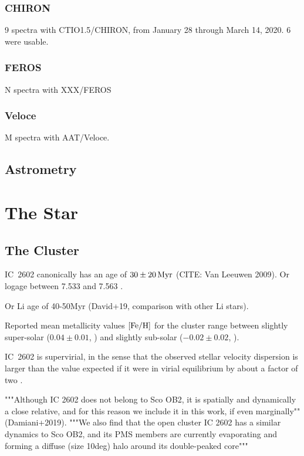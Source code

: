 \documentclass[12pt,twocolumn,tighten]{aastex62}
\begin{document}
\subsubsection{CHIRON}
9 spectra with CTIO1.5/CHIRON, from January 28 through March 14, 2020.
6 were usable.

\subsubsection{FEROS}
N spectra with XXX/FEROS

\subsubsection{Veloce}
M spectra with AAT/Veloce.

\subsection{Astrometry}


\section{The Star}
\label{sec:star}

\subsection{The Cluster}
\label{subsec:cluster}


IC~2602 canonically has an age of $30\pm20\,{\rm Myr}$ (CITE: Van
Leeuwen 2009).
Or logage between 7.533 and 7.563	\citep{bossini_age_2019}.

Or Li age of 40-50Myr (David+19, comparison with other Li stars).

Reported mean metallicity values ${\rm [Fe/H]}$ for the cluster range between
slightly super-solar ($0.04\pm0.01$, \citealt{baratella_gaia-eso_2020}) and
slightly sub-solar ($-0.02 \pm 0.02$, \citealt{netopil_metallicity_2016}).

IC~2602 is supervirial, in the sense that the observed stellar velocity
dispersion is larger than the value expected if it were in virial equilibrium
by about a factor of two \citep{bravi_gaia-eso_2018}.

"""Although IC 2602 does not belong to Sco OB2, it is
spatially and dynamically a close relative, and for this reason
we include it in this work, if even marginally"" (Damiani+2019).
"""We also find that the open cluster IC 2602 has a similar dynamics
to Sco OB2, and its PMS members are currently evaporating and forming
a diffuse (size 10deg) halo around its double-peaked core"""
\end{document}
